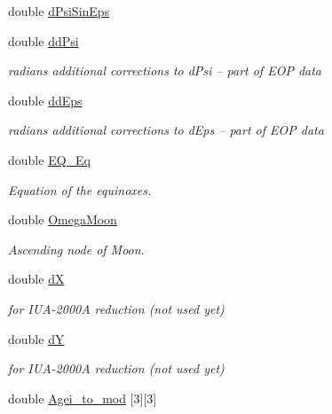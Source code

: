 \begin{CompactItemize}
\item 
double \hyperlink{struct_lgm___c_trans_693724f063518972e1b52489e9b950b6}{dPsiSinEps}
\item 
double \hyperlink{struct_lgm___c_trans_437c2ba595193e711cf05a936202ff7c}{ddPsi}
\begin{CompactList}\small\item\em radians additional corrections to dPsi -- part of EOP data \item\end{CompactList}\item 
double \hyperlink{struct_lgm___c_trans_b89becceff8337966d19fd8009f67e8a}{ddEps}
\begin{CompactList}\small\item\em radians additional corrections to dEps -- part of EOP data \item\end{CompactList}\item 
double \hyperlink{struct_lgm___c_trans_c6f3be420027cbc3b4eb413d913b98d1}{EQ\_\-Eq}
\begin{CompactList}\small\item\em Equation of the equinoxes. \item\end{CompactList}\item 
double \hyperlink{struct_lgm___c_trans_7f6ddff92744a285390dfa690098f1a6}{OmegaMoon}
\begin{CompactList}\small\item\em Ascending node of Moon. \item\end{CompactList}\item 
double \hyperlink{struct_lgm___c_trans_5559d17f092df97e1797a76209e0caa0}{dX}
\begin{CompactList}\small\item\em for IUA-2000A reduction (not used yet) \item\end{CompactList}\item 
double \hyperlink{struct_lgm___c_trans_5b69e4344b7089d8a3c6db32a3c38551}{dY}
\begin{CompactList}\small\item\em for IUA-2000A reduction (not used yet) \item\end{CompactList}\item 
double \hyperlink{struct_lgm___c_trans_88dca0b548d541262ee03936690683fb}{Agei\_\-to\_\-mod} \mbox{[}3\mbox{]}\mbox{[}3\mbox{]}

\end{CompactItemize}
